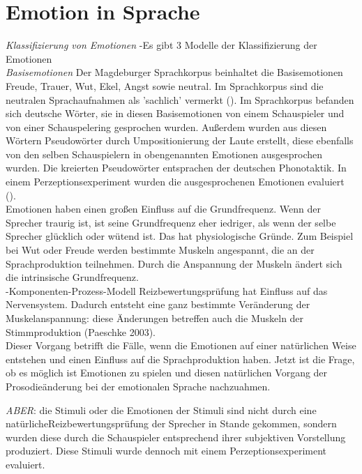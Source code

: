 \documentclass[11pt,a4paper,headsepline,twoside,toc=bibliography]{scrreprt}
\begin{document}
\section{Emotion in Sprache}
\label{sec:emotion_in_speech}



\emph{Klassifizierung von Emotionen}
-Es gibt 3 Modelle der Klassifizierung der Emotionen\\

\emph{Basisemotionen}
Der Magdeburger Sprachkorpus beinhaltet die Basisemotionen Freude, Trauer, Wut, Ekel, Angst sowie neutral. Im Sprachkorpus sind die neutralen Sprachaufnahmen als 'sachlich' vermerkt (\cite{Wendt2002}). Im Sprachkorpus befanden sich deutsche Wörter, sie in diesen Basisemotionen von einem Schauspieler und von einer Schauspelering gesprochen wurden. Außerdem wurden aus diesen Wörtern Pseudowörter durch Umpositionierung der Laute erstellt, diese ebenfalls von den selben Schauspielern in obengenannten Emotionen ausgesprochen wurden. Die kreierten Pseudowörter entsprachen der deutschen Phonotaktik. In einem Perzeptionsexperiment wurden die ausgesprochenen Emotionen evaluiert (\cite{Wendt2003}). \\

Emotionen haben einen großen Einfluss auf die Grundfrequenz. Wenn der Sprecher traurig ist, ist seine Grundfrequenz eher iedriger, als wenn der selbe Sprecher glücklich oder wütend ist. Das hat physiologische Gründe. Zum Beispiel bei Wut oder Freude werden bestimmte Muskeln angespannt, die an der Sprachproduktion teilnehmen. Durch die Anspannung der Muskeln ändert sich die intrinsische Grundfrequenz. \\

-Komponenten-Prozess-Modell 
Reizbewertungsprüfung hat Einfluss auf das Nervensystem. Dadurch entsteht eine ganz bestimmte Veränderung der Muskelanspannung: diese Änderungen betreffen auch die Muskeln der Stimmproduktion (Paeschke 2003).\\

Dieser Vorgang betrifft die Fälle, wenn die Emotionen auf einer natürlichen Weise entstehen und einen Einfluss auf die Sprachproduktion haben. Jetzt ist die Frage, ob es möglich ist Emotionen zu spielen und diesen natürlichen Vorgang der Prosodieänderung bei der emotionalen Sprache nachzuahmen. 

\emph{ABER}: die Stimuli oder die Emotionen der Stimuli sind nicht durch eine natürlicheReizbewertungsprüfung der Sprecher in Stande gekommen, sondern wurden diese durch die Schauspieler entsprechend ihrer subjektiven Vorstellung produziert. Diese Stimuli wurde dennoch mit einem Perzeptionsexperiment evaluiert.\\
\end{document}
